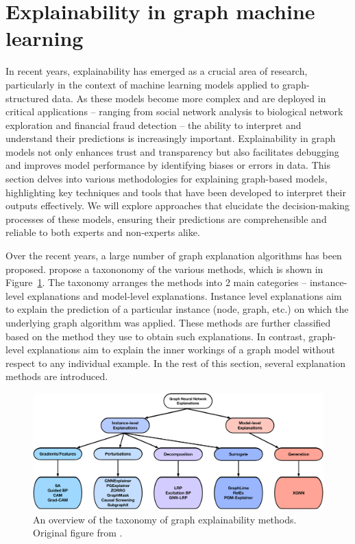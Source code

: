 \section{Explainability in graph machine learning}

In recent years, explainability has emerged as a crucial area of research, particularly in the context of machine learning models applied to graph-structured data. As these models become more complex and are deployed in critical applications -- ranging from social network analysis to biological network exploration and financial fraud detection -- the ability to interpret and understand their predictions is increasingly important. Explainability in graph models not only enhances trust and transparency but also facilitates debugging and improves model performance by identifying biases or errors in data. This section delves into various methodologies for explaining graph-based models, highlighting key techniques and tools that have been developed to interpret their outputs effectively. We will explore approaches that elucidate the decision-making processes of these models, ensuring their predictions are comprehensible and reliable to both experts and non-experts alike.

Over the recent years, a large number of graph explanation algorithms has been proposed. \cite{yuan_explainability_2022} propose a taxononomy of the various methods, which is shown in Figure~\ref{fig:graph-explainability-taxonomy}. The taxonomy arranges the methods into 2 main categories -- instance-level explanations and model-level explanations. Instance level explanations aim to explain the prediction of a particular instance (node, graph, etc.) on which the underlying graph algorithm was applied. These methods are further classified based on the method they use to obtain such explanations. In contrast, graph-level explanations aim to explain the inner workings of a graph model without respect to any individual example. In the rest of this section, several explanation methods are introduced.

\begin{figure}
	\includegraphics[width=\linewidth]{images/graph-explainability-taxonomy.pdf}
	\caption{An overview of the taxonomy of graph explainability methods. Original figure from \cite{yuan_explainability_2022}.}
	\label{fig:graph-explainability-taxonomy}
\end{figure}

